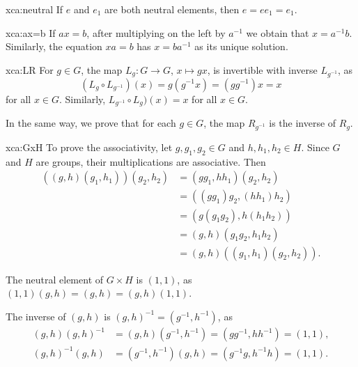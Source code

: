 \begin{sol}{xca:neutral}
If $e$ and $e_1$ are both neutral elements, then $e=ee_1=e_1$. 
\end{sol}

\begin{sol}{xca:ax=b}
    If $ax=b$, after multiplying on the left by $a^{-1}$ we
    obtain that $x=a^{-1}b$. Similarly, the equation $xa=b$ 
    has $x=ba^{-1}$ as its unique solution. 
\end{sol}

\begin{sol}{xca:LR}
    For $g\in G$, the map $L_g\colon G\to G$, $x\mapsto gx$, is invertible 
    with inverse $L_{g^{-1}}$, as
    \[
    (L_g\circ L_{g^{-1}})(x)=g(g^{-1}x)=(gg^{-1})x=x
    \]
    for all $x\in G$. Similarly, $L_{g^{-1}}\circ L_g)(x)=x$ for all $x\in G$. 
    
    In the same way, we prove that 
    for each $g\in G$, the map $R_{g^{-1}}$ is the inverse of $R_g$. 
\end{sol}

\begin{sol}{xca:GxH}
    To prove the associativity, let $g,g_1,g_2\in G$ and 
    $h,h_1,h_2\in H$. Since $G$ and $H$ are groups, 
    their multiplications are associative. Then 
    \begin{align*}
        ((g,h)(g_1,h_1))(g_2,h_2) &= (gg_1,hh_1)(g_2,h_2)\\
        &=((gg_1)g_2,(hh_1)h_2)\\
        &= (g(g_1g_2),h(h_1h_2))\\
        &= (g,h)(g_1g_2,h_1h_2)\\
        &= (g,h)((g_1,h_1)(g_2,h_2)).
    \end{align*}
    
    The neutral element of $G\times H$ is $(1,1)$, as $(1,1)(g,h)=(g,h)=(g,h)(1,1)$. 
    
    The inverse
    of $(g,h)$ is $(g,h)^{-1}=(g^{-1},h^{-1})$, as
    \begin{align*}
    (g,h)(g,h)^{-1}&=(g,h)(g^{-1},h^{-1})=(gg^{-1},hh^{-1})=(1,1),\\
    (g,h)^{-1}(g,h)&=(g^{-1},h^{-1})(g,h)=(g^{-1}g,h^{-1}h)=(1,1).
    \end{align*}
\end{sol}


